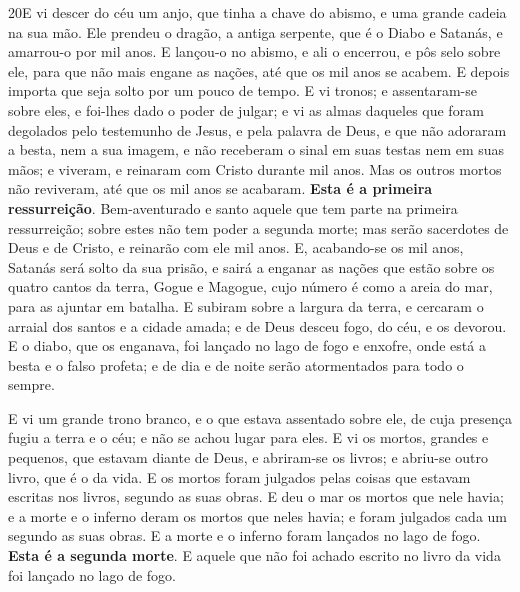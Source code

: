 \medskip

\lettrine{20} E vi descer do céu um anjo, que tinha a chave do
abismo, e uma grande cadeia na sua mão. Ele prendeu o dragão, a
antiga serpente, que é o Diabo e Satanás, e amarrou-o por mil anos.
E lançou-o no abismo, e ali o encerrou, e pôs selo sobre ele,
para que não mais engane as nações, até que os mil anos se acabem. E
depois importa que seja solto por um pouco de tempo. E vi
tronos; e assentaram-se sobre eles, e foi-lhes dado o poder de
julgar; e vi as almas daqueles que foram degolados pelo testemunho
de Jesus, e pela palavra de Deus, e que não adoraram a besta, nem a
sua imagem, e não receberam o sinal em suas testas nem em suas mãos;
e viveram, e reinaram com Cristo durante mil anos. Mas os outros
mortos não reviveram, até que os mil anos se acabaram. \textbf{Esta
é a primeira ressurreição}. Bem-aventurado e santo aquele que
tem parte na primeira ressurreição; sobre estes não tem poder a
segunda morte; mas serão sacerdotes de Deus e de Cristo, e reinarão
com ele mil anos. E, acabando-se os mil anos, Satanás será solto
da sua prisão, e sairá a enganar as nações que estão sobre os
quatro cantos da terra, Gogue e Magogue, cujo número é como a areia
do mar, para as ajuntar em batalha. E subiram sobre a largura da
terra, e cercaram o arraial dos santos e a cidade amada; e de Deus
desceu fogo, do céu, e os devorou. E o diabo, que os
enganava, foi lançado no lago de fogo e enxofre, onde está a besta e
o falso profeta; e de dia e de noite serão atormentados para todo o
sempre.

E vi um grande trono branco, e o que estava assentado sobre ele,
de cuja presença fugiu a terra e o céu; e não se achou lugar para
eles. E vi os mortos, grandes e pequenos, que estavam diante
de Deus, e abriram-se os livros; e abriu-se outro livro, que é o da
vida. E os mortos foram julgados pelas coisas que estavam escritas
nos livros, segundo as suas obras. E deu o mar os mortos que
nele havia; e a morte e o inferno deram os mortos que neles havia; e
foram julgados cada um segundo as suas obras. E a morte e o
inferno foram lançados no lago de fogo. \textbf{Esta é a segunda
morte}. E aquele que não foi achado escrito no livro da vida
foi lançado no lago de fogo.

\medskip

